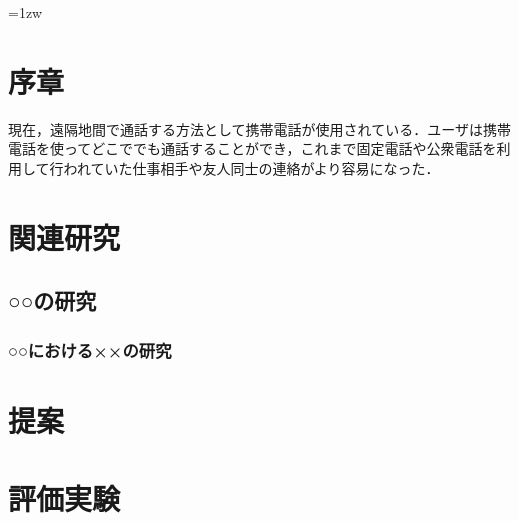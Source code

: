 \documentclass[a4paper]{jreport}	%
\subtitle{—図書館情報メディア研究科の場合—}{: A Case Study at the Graduate School of Library, Information, and Media Studies}
\begin{document}
\makecover

\addtolength{\textheight}{-5mm}	%
\setlength{\footskip}{15mm}	%
\fontsize{11pt}{15pt}\selectfont

\pagebreak\setcounter{page}{1}
\tableofcontents
\listoffigures

\parindent=1zw	%
\pagebreak\setcounter{page}{1}
\pagestyle{plain}


\chapter{序章}
現在，遠隔地間で通話する方法として携帯電話が使用されている．ユーザは携帯電話を使ってどこででも通話することができ，これまで固定電話や公衆電話を利用して行われていた仕事相手や友人同士の連絡がより容易になった．

\chapter{関連研究}
\section{○○の研究}
\subsection{○○における××の研究}

\chapter{提案}

\chapter{評価実験}
\end{document}
